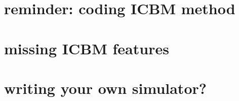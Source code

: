 
\section{reminder: coding ICBM method}



\section{missing ICBM features}

\section{writing your own simulator?}

